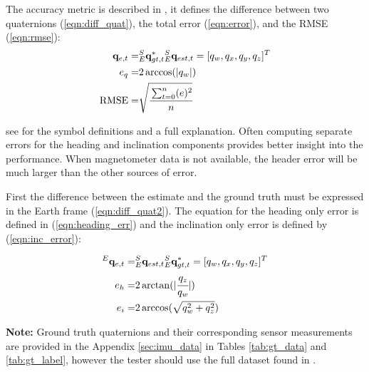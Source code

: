 \documentclass[12pt, titlepage]{article}
\begin{document}
The accuracy metric is described in \cite{broad}, it defines the difference between two quaternions
(\ref{eqn:diff_quat}), the total error (\ref{eqn:error}), and the RMSE (\ref{eqn:rmse}):
\begin{align}
    \mathbf{q}_{e, t} =& {}^S_E\mathbf{q}^{*}_{gt, t}  {}^S_E\mathbf{q}_{est, t} = [q_w, q_x, q_y, q_z]^T \label{eqn:diff_quat} \\
    e_q =& 2 \arccos(|q_w|)  \label{eqn:error}\\
    \text{RMSE} =& \sqrt{\cfrac{\sum_{t=0}^n(e)^2}{n}}  \label{eqn:rmse}
\end{align}

see \cite{broad} for the symbol definitions and a full explanation. Often computing separate errors
for the heading and inclination components provides better insight into the performance. When
magnetometer data is not available, the header error will be much larger than the other sources of
error.

First the difference between the estimate and the ground truth must be expressed in the Earth frame
(\ref{eqn:diff_quat2}). The equation for the heading only error is defined in
(\ref{eqn:heading_err}) and the inclination only error is defined by (\ref{eqn:inc_error}):

\begin{align}
    {}^E \mathbf{q}_{e,t} =& {}^S_E\mathbf{q}_{est, t} {}^S_E\mathbf{q}^{*}_{gt, t} = [q_w, q_x, q_y, q_z]^T \label{eqn:diff_quat2} \\
    e_{h} =& 2 \arctan(|\cfrac{q_z}{q_w}|) \label{eqn:heading_err} \\
    e_{i} =&  2 \arccos(\sqrt{q_w^2 + q_z^2}) \label{eqn:inc_error}
\end{align}

\textbf{Note:} Ground truth quaternions and their corresponding sensor measurements are provided in
the Appendix \ref{sec:imu_data} in Tables \ref{tab:gt_data} and \ref{tab:gt_label}, however the
tester should use the full dataset found in \citep{broad_code}.
\end{document}

